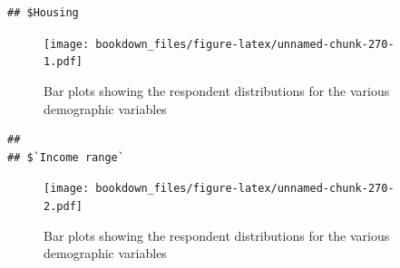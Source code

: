 \documentclass[
]{krantz}
\makeatletter
\newenvironment{Shaded}{\begin{snugshade}}{\end{snugshade}}
\newcommand{\AttributeTok}[1]{\textcolor[rgb]{0.61,0.61,0.61}{#1}}
\newcommand{\ControlFlowTok}[1]{\textcolor[rgb]{0.27,0.27,0.27}{\textbf{#1}}}
\newcommand{\DecValTok}[1]{\textcolor[rgb]{0.06,0.06,0.06}{#1}}
\newcommand{\FunctionTok}[1]{\textcolor[rgb]{0,0,0}{#1}}
\newcommand{\NormalTok}[1]{#1}
\newcommand{\OtherTok}[1]{\textcolor[rgb]{0.37,0.37,0.37}{#1}}
\newcommand{\SpecialCharTok}[1]{\textcolor[rgb]{0,0,0}{#1}}
\newcommand{\StringTok}[1]{\textcolor[rgb]{0.5,0.5,0.5}{#1}}
\newenvironment{kframe}{%
\medskip{}
\setlength{\fboxsep}{.8em}
 \def\at@end@of@kframe{}%
 \ifinner\ifhmode%
  \def\at@end@of@kframe{\end{minipage}}%
  \begin{minipage}{\columnwidth}%
 \fi\fi%
 \def\FrameCommand##1{\hskip\@totalleftmargin \hskip-\fboxsep
 \colorbox{shadecolor}{##1}\hskip-\fboxsep
     \hskip-\linewidth \hskip-\@totalleftmargin \hskip\columnwidth}%
 \MakeFramed {\advance\hsize-\width
   \@totalleftmargin\z@ \linewidth\hsize
   \@setminipage}}%
 {\par\unskip\endMakeFramed%
 \at@end@of@kframe}
\renewenvironment{Shaded}{\begin{kframe}}{\end{kframe}}
\makeatother
\begin{document}
\begin{Shaded}
\end{Shaded}

\begin{verbatim}
## $Housing
\end{verbatim}

\begin{figure}
\centering
\texttt{[image: bookdown\_files/figure-latex/unnamed-chunk-270-1.pdf]}
\caption{\label{fig:unnamed-chunk-270-1}Bar plots showing the respondent distributions for the various demographic variables}
\end{figure}

\begin{verbatim}
## 
## $`Income range`
\end{verbatim}

\begin{figure}
\centering
\texttt{[image: bookdown\_files/figure-latex/unnamed-chunk-270-2.pdf]}
\caption{\label{fig:unnamed-chunk-270-2}Bar plots showing the respondent distributions for the various demographic variables}
\end{figure}
\end{document}
